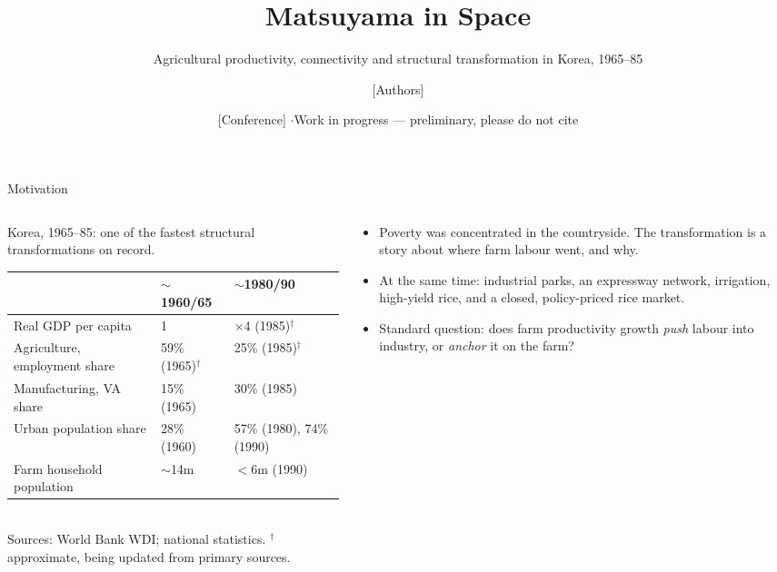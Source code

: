 \documentclass[10pt,aspectratio=169]{beamer}
\title{Matsuyama in Space}
\subtitle{Agricultural productivity, connectivity and structural transformation in Korea,
1965--85}
\author{[Authors]}
\institute{[Affiliations]}
\date{[Conference] \quad$\cdot$\quad Work in progress --- preliminary, please do not cite}
\newcommand{\hl}[1]{\textcolor{mOrange}{#1}}
\newcommand{\unv}{$^{\dagger}$}
\begin{document}
\maketitle

\begin{frame}{Motivation}
  \begin{columns}[T]
    \begin{column}{0.57\textwidth}
      Korea, 1965--85: one of the fastest structural transformations on record.
      \vspace{0.4em}

      \scriptsize
      \begin{tabular}{@{}lll@{}}
        \toprule
        & $\sim$1960/65 & $\sim$1980/90 \\
        \midrule
        Real GDP per capita & 1 & $\times$4 (1985)\unv \\
        Agriculture, employment share & 59\% (1965)\unv & 25\% (1985)\unv \\
        Manufacturing, VA share & 15\% (1965) & 30\% (1985) \\
        Urban population share & 28\% (1960) & 57\% (1980), 74\% (1990) \\
        Farm household population & $\sim$14m & $<$6m (1990) \\
        \bottomrule
      \end{tabular}\\[0.3em]
      \tiny Sources: World Bank WDI; national statistics. \unv{} approximate, being updated
      from primary sources.
    \end{column}
    \begin{column}{0.39\textwidth}
      \small
      \begin{itemize}
        \item Poverty was concentrated in the \hl{countryside}. The transformation is a
              story about where farm labour went, and why.
        \item At the same time: industrial parks, an expressway network, irrigation,
              high-yield rice, and a closed, policy-priced rice market.
        \item Standard question: does farm productivity growth \emph{push} labour into
              industry, or \emph{anchor} it on the farm?
      \end{itemize}
    \end{column}
  \end{columns}
\end{frame}
\end{document}
